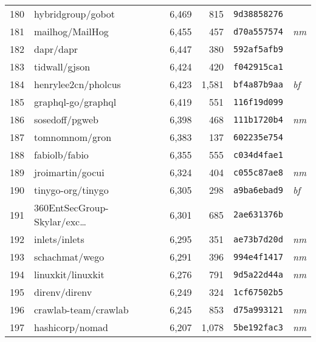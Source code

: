 {\begin{supertabular}{llrrll}
        180 &                  hybridgroup/gobot &  6,469 &    815 &  \texttt{9d38858276} &              \\
        181 &                    mailhog/MailHog &  6,455 &    457 &  \texttt{d70a557574} &  \textit{nm} \\
        182 &                          dapr/dapr &  6,447 &    380 &  \texttt{592af5afb9} &              \\
        183 &                      tidwall/gjson &  6,424 &    420 &  \texttt{f042915ca1} &              \\
        184 &                henrylee2cn/pholcus &  6,423 &  1,581 &  \texttt{bf4a87b9aa} &  \textit{bf} \\
        185 &                 graphql-go/graphql &  6,419 &    551 &  \texttt{116f19d099} &              \\
        186 &                     sosedoff/pgweb &  6,398 &    468 &  \texttt{111b1720b4} &  \textit{nm} \\
        187 &                     tomnomnom/gron &  6,383 &    137 &  \texttt{602235e754} &              \\
        188 &                      fabiolb/fabio &  6,355 &    555 &  \texttt{c034d4fae1} &              \\
        189 &                   jroimartin/gocui &  6,324 &    404 &  \texttt{c055c87ae8} &  \textit{nm} \\
        190 &                  tinygo-org/tinygo &  6,305 &    298 &  \texttt{a9ba6ebad9} &  \textit{bf} \\
        191 &    360EntSecGroup-Skylar/exc\ldots &  6,301 &    685 &  \texttt{2ae631376b} &              \\
        192 &                      inlets/inlets &  6,295 &    351 &  \texttt{ae73b7d20d} &  \textit{nm} \\
        193 &                     schachmat/wego &  6,291 &    396 &  \texttt{994e4f1417} &  \textit{nm} \\
        194 &                  linuxkit/linuxkit &  6,276 &    791 &  \texttt{9d5a22d44a} &  \textit{nm} \\
        195 &                      direnv/direnv &  6,249 &    324 &  \texttt{1cf67502b5} &              \\
        196 &               crawlab-team/crawlab &  6,245 &    853 &  \texttt{d75a993121} &  \textit{nm} \\
        197 &                    hashicorp/nomad &  6,207 &  1,078 &  \texttt{5be192fac3} &  \textit{nm} \\

\end{supertabular}}
